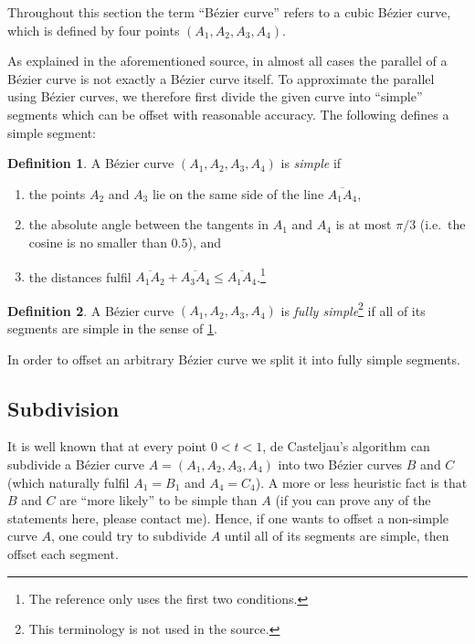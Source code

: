 \documentclass[12pt,a4paper]{article}
\theoremstyle{definition}
\newtheorem{definition}{Definition}[section]
\begin{document}
Throughout this section the term ``Bézier curve'' refers to a cubic Bézier curve, which is defined by four points $(A_1, A_2, A_3, A_4)$.

As explained in the aforementioned source, in almost all cases the parallel of a Bézier curve is not exactly a Bézier curve itself. To approximate the parallel using Bézier curves, we therefore first divide the given curve into ``simple'' segments which can be offset with reasonable accuracy. The following defines a simple segment:
\begin{definition}
  \label{def:simpleCurve}
  A Bézier curve $(A_1, A_2, A_3, A_4)$ is \emph{simple} if
  \begin{enumerate}
    \item the points $A_2$ and $A_3$ lie on the same side of the line $\overline{A_1A_4}$,
    \item the absolute angle between the tangents in $A_1$ and $A_4$ is at most $\pi/3$ (i.e.\ the cosine is no smaller than $0.5$), and
    \item the distances fulfil $\overline{A_1A_2} + \overline{A_3A_4} \leq \overline{A_1A_4}$.\footnote{The reference only uses the first two conditions.}
  \end{enumerate}
\end{definition}
\begin{definition}
  \label{def:fullySimpleCurve}
  A Bézier curve $(A_1, A_2, A_3, A_4)$ is \emph{fully simple}\footnote{This terminology is not used in the source.} if all of its segments are simple in the sense of \cref{def:simpleCurve}.
\end{definition}
In order to offset an arbitrary Bézier curve we split it into fully simple segments.

\subsection{Subdivision}

It is well known that at every point $0 < t < 1$, de Casteljau's algorithm can subdivide a Bézier curve $A = (A_1, A_2, A_3, A_4)$ into two Bézier curves $B$ and $C$ (which naturally fulfil $A_1 = B_1$ and $A_4 = C_4$). A more or less heuristic fact is that $B$ and $C$ are ``more likely'' to be simple than $A$ (if you can prove any of the statements here, please contact me). Hence, if one wants to offset a non-simple curve $A$, one could try to subdivide $A$ until all of its segments are simple, then offset each segment.
\end{document}
